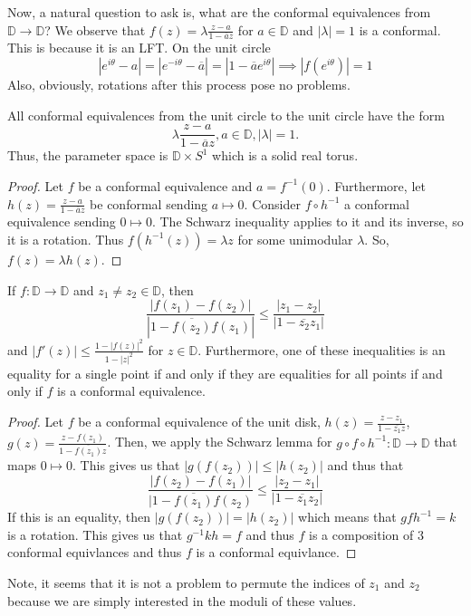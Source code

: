 \documentclass[11pt,leqno,oneside]{amsart}
\numberwithin{thm}{section}
\newcommand{\D}{\mathbb{D}}
\begin{document}
  Now, a natural question to ask is, what are the conformal
  equivalences from $\D \to \D$? We observe that $f(z) =
  \lambda\frac{z-a}{1-\overline{a}z}$ for $a \in \D$ and $|\lambda| =
  1$ is a conformal. This is because it is an LFT. On the unit
  circle \[
    |e^{i \theta} - a| = |e^{-i\theta} - \overline{a}| = |1 -
    \overline{a}e^{i\theta}| \implies |f(e^{i\theta})| = 1
  \]
  Also, obviously, rotations after this process pose no problems.
  \begin{thm}
    All conformal equivalences from the unit circle to the unit circle
    have the form \[
      \lambda \frac{z-a}{1-\overline{a}z}, a \in \D, |\lambda| = 1.
    \]
    Thus, the parameter space is $\D \times S^1$ which is a solid real torus.
  \end{thm}
  \begin{proof}
    Let $f$ be a conformal equivalence and $a =
    f^{-1}(0)$. Furthermore, let $h(z) = \frac{z-a}{1-\overline{a}z}$
    be conformal sending $a \mapsto 0$. Consider $f \circ h^{-1}$ a
    conformal equivalence sending $0 \mapsto 0$. The Schwarz
    inequality applies to it and its inverse, so it is a
    rotation. Thus $f(h^{-1}(z)) = \lambda z$ for some unimodular
    $\lambda$. So, $f(z) = \lambda h(z)$.
  \end{proof}
  \begin{lem}
    If $f: \D \to \D$ and $z_1 \neq z_2 \in \D$, then \[
      \frac{|f(z_1)-f(z_2)|}{|1-\overline{f(z_2)}f(z_1)|} \leq \frac{|z_1-z_2|}{|1-\overline{z_2}z_1|}
    \]
    and $|f'(z)| \leq \frac{1-|f(z)|^2}{1-|z|^2}$ for $z \in
    \D$. Furthermore, one of these inequalities is an equality for
    a single point if and only if they are equalities for all points
    if and only if $f$ is a conformal equivalence.
  \end{lem}
  \begin{proof}
    Let $f$ be a conformal equivalence of the unit disk, $h(z) =
    \frac{z-z_1}{1-\overline{z_1}z}$, $g(z) =
    \frac{z-f(z_1)}{1-\overline{f(z_1)}z}$. Then, we apply the Schwarz
    lemma for $g\circ f \circ h^{-1}: \D \to \D$ that maps $0 \mapsto
    0$. This gives us that $|g(f(z_2))| \leq |h(z_2)|$ and thus that \[
      \frac{|f(z_2)-f(z_1)|}{|1-\overline{f(z_1)}f(z_2)} \leq \frac{|z_2-z_1|}{|1-\overline{z_1}z_2|}
   \]
   If this is an equality, then $|g(f(z_2))| = |h(z_2)|$ which means
   that $gfh^{-1} = k$ is a rotation. This gives us that $g^{-1}kh =
   f$ and thus $f$ is a composition of 3 conformal equivlances and
   thus $f$ is a conformal equivlance.
 \end{proof}
 Note, it seems that it is not a problem to permute the indices of
 $z_1$ and $z_2$ because we are simply interested in the moduli of
 these values.
\end{document}
